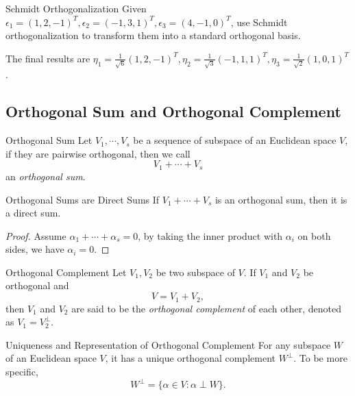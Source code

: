 \begin{example}{Schmidt Orthogonalization}{}
  Given $\epsilon_1 = (1, 2, -1)^T, \epsilon_2 = (-1,3,1)^T, \epsilon_3 =
  (4,-1,0)^T$,
  use Schmidt orthogonalization to transform them into a standard orthogonal basis.
\end{example}

\begin{solution}
  The final results are $\eta_{1}=\frac{1}{\sqrt{6}}(1,2,-1)^{T},\eta_{2}=\frac{1}{\sqrt{3}}(-1,1,1)^{T},\eta_{3}=\frac{1}{\sqrt{2}}(1,0,1)^{T}$.
\end{solution}

\subsection{Orthogonal Sum and Orthogonal Complement}

\begin{definition}{Orthogonal Sum}{}
  Let $V_1, \cdots, V_s$ be a sequence of subspace of an Euclidean space $V$,
  if they are pairwise orthogonal, then we call
  \begin{equation}
    V_1 + \cdots + V_s
  \end{equation}
  an \emph{orthogonal sum}.
\end{definition}

\begin{proposition}{Orthogonal Sums are Direct Sums}{}
  If $V_1 + \cdots +V_s$ is an orthogonal sum,
  then it is a direct sum.
\end{proposition}

\begin{proof}
  Assume $\alpha_1 + \cdots + \alpha_s = 0$,
  by taking the inner product with $\alpha_i$ on both sides, we have $\alpha_i = 0$.
\end{proof}

\begin{definition}{Orthogonal Complement}{}
  Let $V_1, V_2$ be two subspace of $V$.
  If $V_1$ and $V_2$ be orthogonal and
  \begin{equation}
    V = V_1 + V_2,
  \end{equation}
  then $V_1$ and $V_2$ are said to be the \emph{orthogonal complement} of each
  other,
  denoted as $V_1 = V_2^{\perp}$.
\end{definition}

\begin{proposition}{Uniqueness and Representation of Orthogonal Complement}{}
  For any subspace $W$ of an Euclidean space $V$,
  it has a unique orthogonal complement $W^{\perp}$.
  To be more specific,
  \begin{equation}
    W^{\perp} = \{\alpha \in V: \alpha \perp W\}.
  \end{equation}
\end{proposition}

